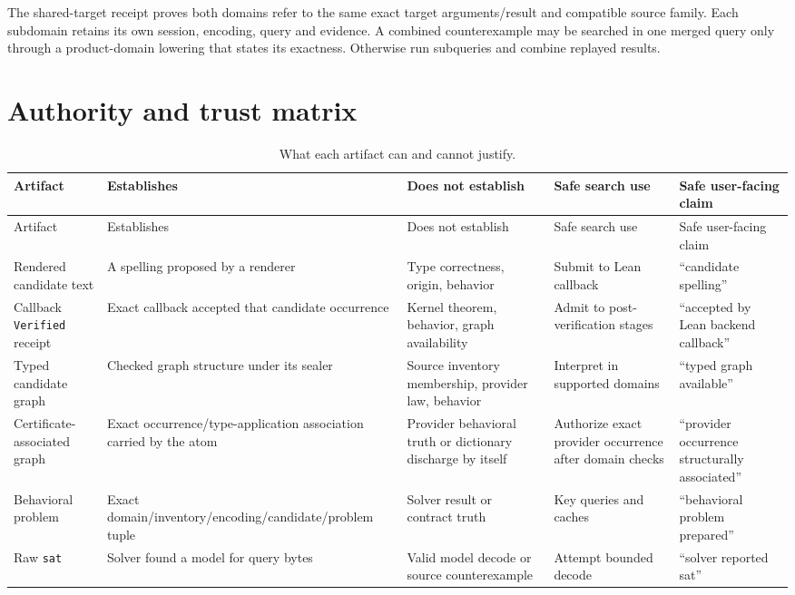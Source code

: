 \documentclass[11pt,oneside]{report}
\newcommand{\code}[1]{\texttt{#1}}
\begin{document}
The shared-target receipt proves both domains refer to the same exact target arguments/result and compatible source family. Each subdomain retains its own session, encoding, query and evidence. A combined counterexample may be searched in one merged query only through a product-domain lowering that states its exactness. Otherwise run subqueries and combine replayed results.

\chapter{Authority and trust matrix}
\label{app:trust}

\begin{landscape}
\begin{longtable}{@{}L{0.19\textwidth}L{0.18\textwidth}L{0.18\textwidth}L{0.18\textwidth}L{0.20\textwidth}@{}}
\caption{What each artifact can and cannot justify.}\label{tab:authority-matrix}\\
\toprule
Artifact & Establishes & Does not establish & Safe search use & Safe user-facing claim \\
\midrule
\endfirsthead
\toprule
Artifact & Establishes & Does not establish & Safe search use & Safe user-facing claim \\
\midrule
\endhead
\bottomrule
\endfoot
Rendered candidate text & A spelling proposed by a renderer & Type correctness, origin, behavior & Submit to Lean callback & ``candidate spelling'' \\
Callback \code{Verified} receipt & Exact callback accepted that candidate occurrence & Kernel theorem, behavior, graph availability & Admit to post-verification stages & ``accepted by Lean backend callback'' \\
Typed candidate graph & Checked graph structure under its sealer & Source inventory membership, provider law, behavior & Interpret in supported domains & ``typed graph available'' \\
Certificate-associated graph & Exact occurrence/type-application association carried by the atom & Provider behavioral truth or dictionary discharge by itself & Authorize exact provider occurrence after domain checks & ``provider occurrence structurally associated'' \\
Behavioral problem & Exact domain/inventory/encoding/candidate/problem tuple & Solver result or contract truth & Key queries and caches & ``behavioral problem prepared'' \\
Raw \texttt{sat} & Solver found a model for query bytes & Valid model decode or source counterexample & Attempt bounded decode & ``solver reported sat'' \\

\end{longtable}
\end{landscape}
\end{document}
